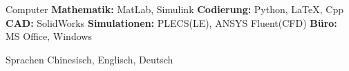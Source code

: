 

\begin{cvskills}

  \cvskill
    {Computer} %
    {\textbf{Mathematik:} MatLab, Simulink \textbf{Codierung:} Python, \LaTeX, Cpp \textbf{CAD:} SolidWorks \textbf{Simulationen:} PLECS(LE), ANSYS Fluent(CFD) \textbf{Büro:} MS Office, Windows} %
    
  \cvskill
    {Sprachen} %
    {Chinesisch, Englisch, Deutsch} %
    
\end{cvskills}
